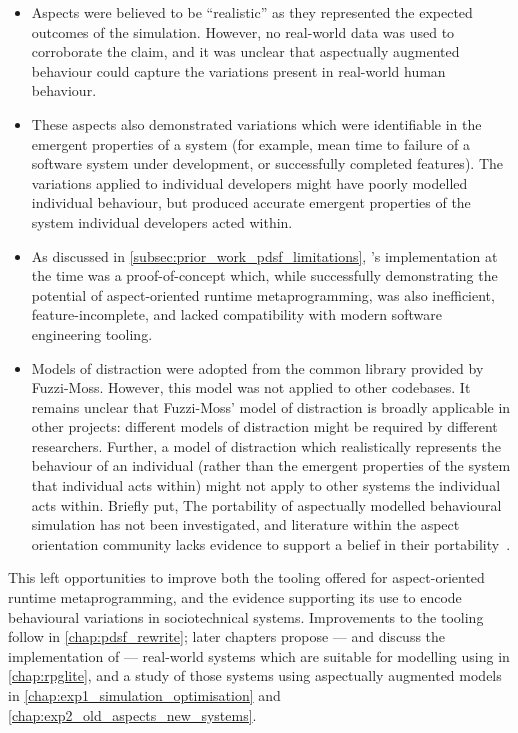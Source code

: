 \begin{itemize}
    \item Aspects were believed to be ``realistic'' as they represented the
    expected outcomes of the simulation. However, no real-world data was used to
    corroborate the claim, and it was unclear that aspectually augmented
    behaviour could capture the variations present in real-world human
    behaviour.
    \item These aspects also demonstrated variations which were identifiable in
    the emergent properties of a system (for example, mean time to failure of a
    software system under development, or successfully completed features). The
    variations applied to individual developers might have poorly modelled
    individual behaviour, but produced accurate emergent properties of the
    system individual developers acted within.
    \item As discussed in \cref{subsec:prior_work_pdsf_limitations}, \pdsf's
    implementation at the time was a proof-of-concept which, while successfully
    demonstrating the potential of aspect-oriented runtime metaprogramming, was
    also inefficient, feature-incomplete, and lacked compatibility with modern
    software engineering tooling.
    \item Models of distraction were adopted from the common library provided by
    Fuzzi-Moss. However, this model was not applied to other codebases. It
    remains unclear that Fuzzi-Moss' model of distraction is broadly applicable
    in other projects: different models of distraction might be required by
    different researchers. Further, a model of distraction which realistically
    represents the behaviour of an individual (rather than the emergent
    properties of the system that individual acts within) might not apply to
    other systems the individual acts within. Briefly put, The portability of
    aspectually modelled behavioural simulation has not been investigated, and
    literature within the aspect orientation community lacks evidence to support
    a belief in their portability~\cite{przybylek2010wrong,Constantinides04aopconsidered,steimann06paradoxical}.
\end{itemize}

This left opportunities to improve both the tooling offered for aspect-oriented
runtime metaprogramming, and the evidence supporting its use to encode
behavioural variations in sociotechnical systems. Improvements to the tooling
follow in \cref{chap:pdsf_rewrite}; later chapters propose --- and discuss the
implementation of --- real-world systems which are suitable for modelling using
\pdsf{} in \cref{chap:rpglite}, and a study of those systems using aspectually
augmented models in \cref{chap:exp1_simulation_optimisation} and \cref{chap:exp2_old_aspects_new_systems}.
